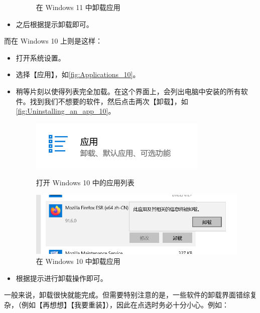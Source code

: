 \begin{itemize}
\begin{figure}[htb!]
\begin{minipage}{.49\textwidth}
        \caption{在 Windows 11 中卸载应用}
        \label{fig:Uninstall_an_app_11}
    \end{minipage}
    \end{figure}
  \item 之后根据提示卸载即可。
\end{itemize}

而在 Windows 10 上则是这样：

\begin{itemize}
  \item 打开系统设置。
  \item 选择【应用】，如\autoref{fig:Applications_10}。
  \item 稍等片刻以使得列表完全加载。在这个界面上，会列出电脑中安装的所有软件。找到我们不想要的软件，然后点击两次【卸载】，如\autoref{fig:Uninstalling_an_app_10}。
  \begin{figure}[htb!]
    \centering
    \begin{minipage}{.44\textwidth}
      \centering
      \includegraphics[width=.8\textwidth]{assets/basic/Applications_10.png}
      \caption{打开 Windows 10 中的应用列表}
      \label{fig:Applications_10}
    \end{minipage}
    \begin{minipage}{.55\textwidth}
      \centering
      \includegraphics[width=.9\textwidth]{assets/basic/Uninstalling_an_app_10.png}
      \caption{在 Windows 10 中卸载应用}
      \label{fig:Uninstalling_an_app_10}
    \end{minipage}
  \end{figure}
  \item 根据提示进行卸载操作即可。
\end{itemize}

一般来说，卸载很快就能完成。但需要特别注意的是，一些软件的卸载界面错综复杂，（例如【再想想】【我要重装】），因此在点选时务必十分小心。例如：

